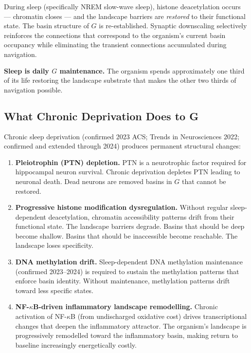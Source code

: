 \documentclass[10pt, a4paper]{article}
\begin{document}
During sleep (specifically NREM
slow-wave sleep), histone deacetylation
occurs --- chromatin closes --- and
the landscape barriers are
\textit{restored} to their functional
state. The basin structure of $G$ is
re-established. Synaptic downscaling
selectively reinforces the connections
that correspond to the organism's
current basin occupancy while
eliminating the transient connections
accumulated during navigation.

\textbf{Sleep is daily $G$ maintenance.}
The organism spends approximately one
third of its life restoring the
landscape substrate that makes
the other two thirds of navigation
possible.

\subsection{What Chronic Deprivation Does
to G}

Chronic sleep deprivation (confirmed
2023 ACS; Trends in Neurosciences 2022;
confirmed and extended through 2024)
produces permanent structural changes:

\begin{enumerate}[itemsep=0.2em]
  \item \textbf{Pleiotrophin (PTN)
    depletion.} PTN is a neurotrophic
    factor required for hippocampal
    neuron survival. Chronic deprivation
    depletes PTN leading to neuronal
    death. Dead neurons are removed
    basins in $G$ that cannot be
    restored.

  \item \textbf{Progressive histone
    modification dysregulation.}
    Without regular sleep-dependent
    deacetylation, chromatin
    accessibility patterns drift
    from their functional state.
    The landscape barriers degrade.
    Basins that should be deep become
    shallow. Basins that should be
    inaccessible become reachable.
    The landscape loses specificity.

  \item \textbf{DNA methylation drift.}
    Sleep-dependent DNA methylation
    maintenance (confirmed 2023--2024)
    is required to sustain the
    methylation patterns that enforce
    basin identity. Without maintenance,
    methylation patterns drift toward
    less specific states.

  \item \textbf{NF-$\kappa$B-driven
    inflammatory landscape remodelling.}
    Chronic activation of NF-$\kappa$B
    (from undischarged oxidative cost)
    drives transcriptional changes
    that deepen the inflammatory
    attractor. The organism's landscape
    is progressively remodelled toward
    the inflammatory basin, making
    return to baseline increasingly
    energetically costly.
\end{enumerate}
\end{document}

